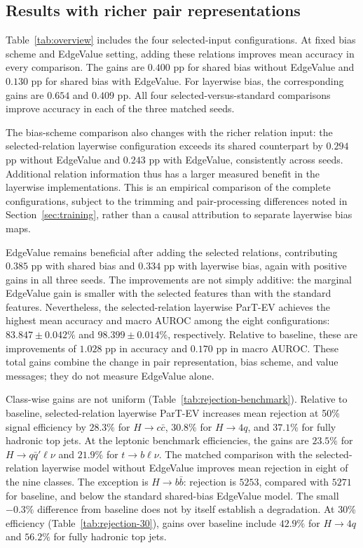 \subsection{Results with richer pair representations}
\label{sec:results-relations}

Table~\ref{tab:overview} includes the four selected-input configurations.
At fixed bias scheme and EdgeValue setting, adding these relations improves
mean accuracy in every comparison. The gains are $0.400$ pp for shared bias
without EdgeValue and $0.130$ pp for shared bias with EdgeValue. For layerwise
bias, the corresponding gains are $0.654$ and $0.409$ pp. All four
selected-versus-standard comparisons improve accuracy in each of the three
matched seeds.

The bias-scheme comparison also changes with the richer relation input:
the selected-relation layerwise configuration exceeds its shared counterpart
by $0.294$ pp without EdgeValue and $0.243$ pp with EdgeValue, consistently
across seeds. Additional relation information thus has a larger measured
benefit in the layerwise implementations. This is an empirical comparison of
the complete configurations, subject to the trimming and pair-processing
differences noted in Section~\ref{sec:training}, rather than a causal
attribution to separate layerwise bias maps.

EdgeValue remains beneficial after adding the selected relations, contributing
$0.385$ pp with shared bias and $0.334$ pp with layerwise bias, again with
positive gains in all three seeds. The improvements are not simply additive:
the marginal EdgeValue gain is smaller with the selected features than with
the standard features. Nevertheless, the selected-relation layerwise
ParT-EV achieves the highest mean accuracy and macro AUROC among the eight
configurations: $83.847\pm0.042\%$ and $98.399\pm0.014\%$, respectively.
Relative to baseline, these are improvements of $1.028$ pp in accuracy and
$0.170$ pp in macro AUROC. These total gains combine the change in pair
representation, bias scheme, and value messages; they do not measure
EdgeValue alone.

Class-wise gains are not uniform (Table~\ref{tab:rejection-benchmark}).
Relative to baseline, selected-relation layerwise ParT-EV increases mean
rejection at 50\% signal efficiency by $28.3\%$ for $H\to c\bar c$,
$30.8\%$ for $H\to4q$, and $37.1\%$ for fully hadronic top jets.
At the leptonic benchmark efficiencies, the gains are $23.5\%$ for
$H\to q\bar q'\ell\nu$ and $21.9\%$ for $t\to b\ell\nu$.
The matched comparison with the selected-relation layerwise model without
EdgeValue improves mean rejection in eight of the nine classes.
The exception is $H\to b\bar b$: rejection is $5253$, compared with $5271$
for baseline, and below the standard shared-bias EdgeValue model. The small
$-0.3\%$ difference from baseline does not by itself establish a degradation.
At 30\% efficiency (Table~\ref{tab:rejection-30}), gains over baseline
include $42.9\%$ for $H\to4q$ and $56.2\%$ for fully hadronic top jets.

